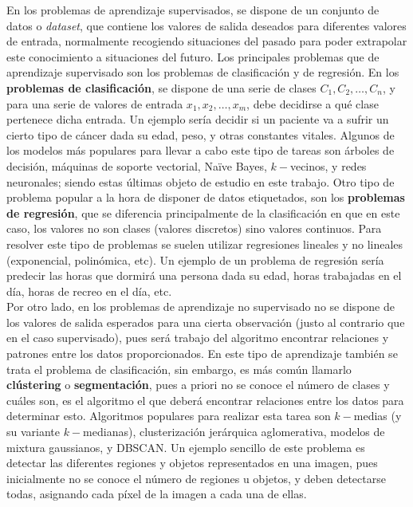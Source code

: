 		En los problemas de aprendizaje supervisados, se dispone de un conjunto de datos o \textit{dataset}, que contiene los valores de salida deseados para diferentes valores de entrada, normalmente recogiendo situaciones del pasado para poder extrapolar este conocimiento a situaciones del futuro. Los principales problemas que de aprendizaje supervisado son los problemas de clasificación y de regresión. En los \textbf{problemas de clasificación}, se dispone de una serie de clases $C_1, C_2, \hdots, C_n$, y para una serie de valores de entrada $x_1, x_2, \hdots, x_m$, debe decidirse a qué clase pertenece dicha entrada. Un ejemplo sería decidir si un paciente va a sufrir un cierto tipo de cáncer dada su edad, peso, y otras constantes vitales. Algunos de los modelos más populares para llevar a cabo este tipo de tareas son árboles de decisión, máquinas de soporte vectorial, Naïve Bayes, $k-$vecinos, y redes neuronales; siendo estas últimas objeto de estudio en este trabajo. Otro tipo de problema popular a la hora de disponer de datos etiquetados, son los \textbf{problemas de regresión}, que se diferencia principalmente de la clasificación en que en este caso, los valores no son clases (valores discretos) sino valores continuos. Para resolver este tipo de problemas se suelen utilizar regresiones lineales y no lineales (exponencial, polinómica, etc). Un ejemplo de un problema de regresión sería predecir las horas que dormirá una persona dada su edad, horas trabajadas en el día, horas de recreo en el día, etc. \\
		
		Por otro lado, en los problemas de aprendizaje no supervisado no se dispone de los valores de salida esperados para una cierta observación (justo al contrario que en el caso supervisado), pues será trabajo del algoritmo encontrar relaciones y patrones entre los datos proporcionados. En este tipo de aprendizaje también se trata el problema de clasificación, sin embargo, es más común llamarlo \textbf{clústering} o \textbf{segmentación}, pues a priori no se conoce el número de clases y cuáles son, es el algoritmo el que deberá encontrar relaciones entre los datos para determinar esto. Algoritmos populares para realizar esta tarea son $k-$medias (y su variante $k-$medianas), clusterización jerárquica aglomerativa, modelos de mixtura gaussianos, y DBSCAN. Un ejemplo sencillo de este problema es detectar las diferentes regiones y objetos representados en una imagen, pues inicialmente no se conoce el número de regiones u objetos, y deben detectarse todas, asignando cada píxel de la imagen a cada una de ellas. 

